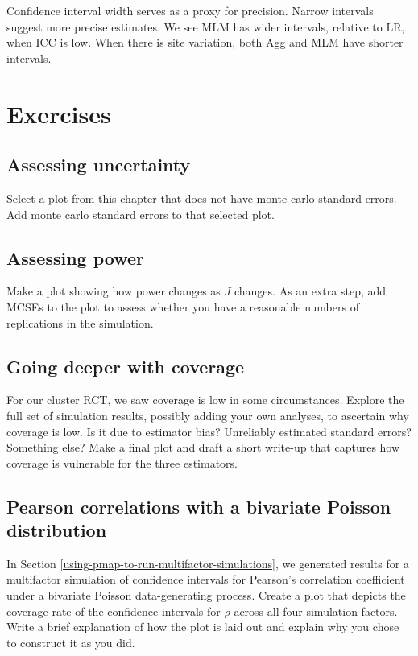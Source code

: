 \documentclass[
]{book}
\begin{document}
Confidence interval width serves as a proxy for precision. Narrow intervals suggest more precise estimates.
We see MLM has wider intervals, relative to LR, when ICC is low. When there is site variation, both Agg and MLM have shorter intervals.

\section{Exercises}\label{exercises-8}

\subsection{Assessing uncertainty}\label{assessing-uncertainty}

Select a plot from this chapter that does not have monte carlo standard errors.
Add monte carlo standard errors to that selected plot.

\subsection{Assessing power}\label{assessing-power}

Make a plot showing how power changes as \(J\) changes.
As an extra step, add MCSEs to the plot to assess whether you have a reasonable numbers of replications in the simulation.

\subsection{Going deeper with coverage}\label{going-deeper-with-coverage}

For our cluster RCT, we saw coverage is low in some circumstances.
Explore the full set of simulation results, possibly adding your own analyses, to ascertain why coverage is low.
Is it due to estimator bias? Unreliably estimated standard errors? Something else?
Make a final plot and draft a short write-up that captures how coverage is vulnerable for the three estimators.

\subsection{Pearson correlations with a bivariate Poisson distribution}\label{pearson-correlations-with-a-bivariate-poisson-distribution}

In Section \ref{using-pmap-to-run-multifactor-simulations}, we generated results for a multifactor simulation of confidence intervals for Pearson's correlation coefficient under a bivariate Poisson data-generating process. Create a plot that depicts the coverage rate of the confidence intervals for \(\rho\) across all four simulation factors.
Write a brief explanation of how the plot is laid out and explain why you chose to construct it as you did.
\end{document}
